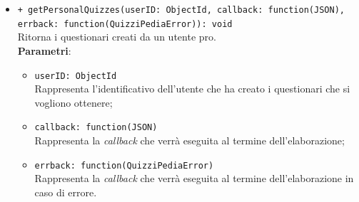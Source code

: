 \begin{itemize}
\begin{itemize}
			\item \texttt{+ getPersonalQuizzes(userID: ObjectId, callback: function(JSON), errback: function(QuizziPediaError)): void}\\
			Ritorna i questionari creati da un utente pro.\\
			\textbf{Parametri}:
			\begin{itemize}
				\item \texttt{userID: ObjectId}\\
				Rappresenta l'identificativo dell'utente che ha creato i questionari che si vogliono ottenere;
				\item \texttt{callback: function(JSON)}\\
				Rappresenta la \textit{callback} che verrà eseguita al termine dell'elaborazione;
				\item \texttt{errback: function(QuizziPediaError)}\\
				Rappresenta la \textit{callback} che verrà eseguita al termine dell'elaborazione in caso di errore.
			\end{itemize}
		\end{itemize}
\end{itemize}